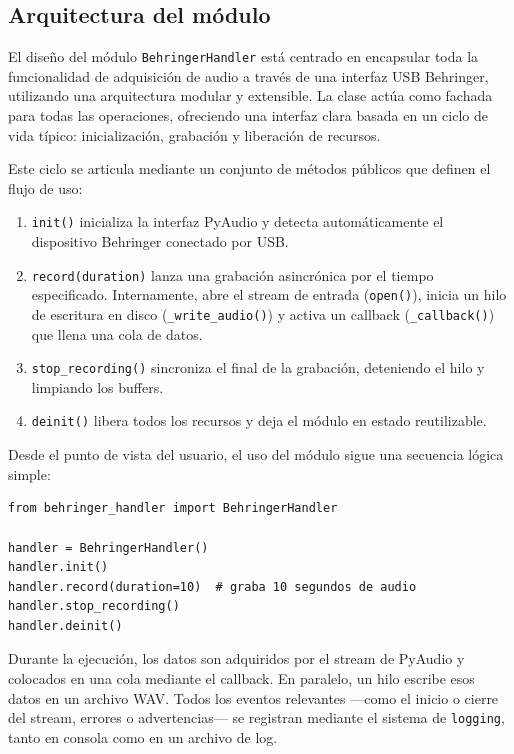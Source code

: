 \subsection{Arquitectura del módulo}

El diseño del módulo \texttt{BehringerHandler} está centrado en encapsular toda la funcionalidad de adquisición de audio a través de una interfaz USB Behringer, utilizando una arquitectura modular y extensible. La clase actúa como fachada para todas las operaciones, ofreciendo una interfaz clara basada en un ciclo de vida típico: inicialización, grabación y liberación de recursos.

Este ciclo se articula mediante un conjunto de métodos públicos que definen el flujo de uso:

\begin{enumerate}
    \item \texttt{init()} inicializa la interfaz PyAudio y detecta automáticamente el dispositivo Behringer conectado por USB.
    \item \texttt{record(duration)} lanza una grabación asincrónica por el tiempo especificado. Internamente, abre el stream de entrada (\texttt{open()}), inicia un hilo de escritura en disco (\texttt{\_write\_audio()}) y activa un callback (\texttt{\_callback()}) que llena una cola de datos.
    \item \texttt{stop\_recording()} sincroniza el final de la grabación, deteniendo el hilo y limpiando los buffers.
    \item \texttt{deinit()} libera todos los recursos y deja el módulo en estado reutilizable.
\end{enumerate}

Desde el punto de vista del usuario, el uso del módulo sigue una secuencia lógica simple:

\begin{verbatim}
from behringer_handler import BehringerHandler

handler = BehringerHandler()
handler.init()
handler.record(duration=10)  # graba 10 segundos de audio
handler.stop_recording()
handler.deinit()
\end{verbatim}

Durante la ejecución, los datos son adquiridos por el stream de PyAudio y colocados en una cola mediante el callback. En paralelo, un hilo escribe esos datos en un archivo WAV. Todos los eventos relevantes —como el inicio o cierre del stream, errores o advertencias— se registran mediante el sistema de \texttt{logging}, tanto en consola como en un archivo de log.

